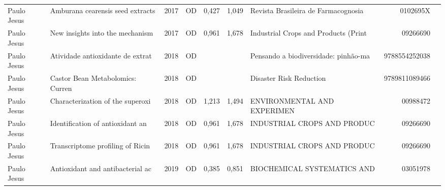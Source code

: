 \documentclass[12pt,brazil]{article}\usepackage[]{graphicx}\usepackage[]{xcolor}
\begin{document}
\begin{longtable}{lllrrllrr}
\rowcolor{duplic}\rowcolor{duplic}\rowcolor{duplic}\rowcolor{duplic}\rowcolor{duplic}\rowcolor{duplic}\rowcolor{duplic}\rowcolor{duplic}\rowcolor{duplic}\rowcolor{duplic}\rowcolor{duplic}\rowcolor{duplic}\rowcolor{duplic}\rowcolor{duplic}\rowcolor{duplic}\rowcolor{duplic}Paulo Jesus & Amburana cearensis seed extracts & 2017 & OD & 0,427 & 1,049 & Revista Brasileira de Farmacognosia  & 0102695X \\
\rowcolor{coautr}\rowcolor{coautr}\rowcolor{coautr}\rowcolor{coautr}\rowcolor{coautr}\rowcolor{coautr}\rowcolor{coautr}\rowcolor{coautr}\rowcolor{coautr}\rowcolor{coautr}\rowcolor{coautr}\rowcolor{coautr}\rowcolor{coautr}\rowcolor{coautr}\rowcolor{coautr}\rowcolor{coautr}Paulo Jesus & New insights into the mechanism  & 2017 & OD & 0,961 & 1,678 & Industrial Crops and Products (Print & 09266690 \\
\rowcolor{coautr}\rowcolor{coautr}\rowcolor{coautr}\rowcolor{coautr}\rowcolor{coautr}\rowcolor{coautr}\rowcolor{coautr}\rowcolor{coautr}\rowcolor{coautr}\rowcolor{coautr}\rowcolor{coautr}\rowcolor{coautr}\rowcolor{coautr}\rowcolor{coautr}\rowcolor{coautr}\rowcolor{coautr}Paulo Jesus & Atividade antioxidante de extrat & 2018 & OD &  &  & Pensando a biodiversidade: pinhão-ma & 9788554252038 \\
Paulo Jesus & Castor Bean Metabolomics: Curren & 2018 & OD &  &  & Disaster Risk Reduction & 9789811089466 \\
Paulo Jesus & Characterization of the superoxi & 2018 & OD & 1,213 & 1,494 & ENVIRONMENTAL AND EXPERIMEN & 00988472 \\
\rowcolor{coautr}\rowcolor{coautr}\rowcolor{coautr}\rowcolor{coautr}\rowcolor{coautr}\rowcolor{coautr}\rowcolor{coautr}\rowcolor{coautr}\rowcolor{coautr}\rowcolor{coautr}\rowcolor{coautr}\rowcolor{coautr}\rowcolor{coautr}\rowcolor{coautr}\rowcolor{coautr}\rowcolor{coautr}Paulo Jesus & Identification of antioxidant an & 2018 & OD & 0,961 & 1,678 & INDUSTRIAL CROPS AND PRODUC & 09266690 \\
\rowcolor{coautr}\rowcolor{coautr}\rowcolor{coautr}\rowcolor{coautr}\rowcolor{coautr}\rowcolor{coautr}\rowcolor{coautr}\rowcolor{coautr}\rowcolor{coautr}\rowcolor{coautr}\rowcolor{coautr}\rowcolor{coautr}\rowcolor{coautr}\rowcolor{coautr}\rowcolor{coautr}\rowcolor{coautr}Paulo Jesus & Transcriptome profiling of Ricin & 2018 & OD & 0,961 & 1,678 & INDUSTRIAL CROPS AND PRODUC & 09266690 \\
Paulo Jesus & Antioxidant and antibacterial ac & 2019 & OD & 0,385 & 0,851 & BIOCHEMICAL SYSTEMATICS AND & 03051978 \\

\end{longtable}
\end{document}
